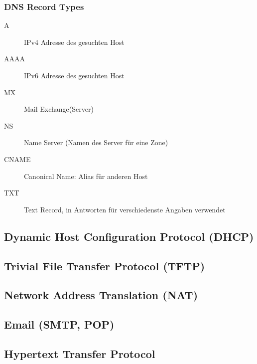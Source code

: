 \subsubsection{DNS Record Types}
\begin{description}
    \item[A] IPv4 Adresse des gesuchten Host 
    \item[AAAA] IPv6 Adresse des gesuchten Host 
    \item[MX] Mail Exchange(Server)
    \item[NS] Name Server (Namen des Server für eine Zone)
    \item[CNAME] Canonical Name: Alias für anderen Host
    \item[TXT] Text Record, in Antworten für verschiedenste Angaben verwendet
\end{description}












\subsection{Dynamic Host Configuration Protocol (DHCP)}




\subsection{Trivial File Transfer Protocol (TFTP)}




\subsection{Network Address Translation (NAT)}




\subsection{Email (SMTP, POP)}




\subsection{Hypertext Transfer Protocol}


